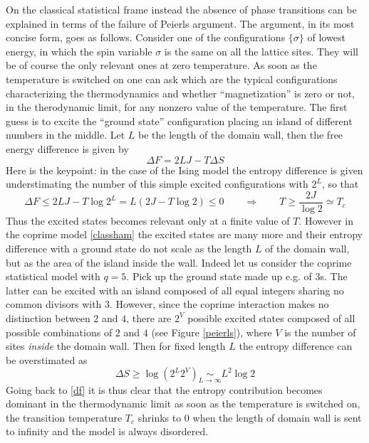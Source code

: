 \documentclass[aps,pra,superscriptaddress]{revtex4}
\newcommand\be            {\begin{equation}}
\newcommand\ee            {\end{equation}}
\renewcommand{\(}{\left(}
\renewcommand{\)}{\right)}
\renewcommand{\[}{\left[}
\renewcommand{\]}{\right]}
\begin{document}
On the classical statistical frame instead the absence of phase transitions can be explained in terms of the failure of Peierls argument. The argument, in its most concise form, goes as follows. Consider one of the configurations $\{ \sigma \}$ of lowest energy, in which the spin variable $\sigma$ is the same on all the lattice sites. They will be of course the only relevant ones at zero temperature. As soon as the temperature is switched on one can ask which are the typical configurations characterizing the thermodynamics and whether ``magnetization'' is zero or not, in the therodynamic limit, for any nonzero value of the temperature. The first guess is to excite the ``ground state'' configuration placing an island of different numbers in the middle. Let $L$ be the length of the domain wall, then the free energy difference is given by
\be 
\Delta F = 2 L J - T \Delta S
\ee
Here is the keypoint: in the case of the Ising model the entropy difference is given understimating the number of this simple excited configurations with $2^L$, so that
\be \label{df}
\Delta F \le 2 L J - T \log 2^L = L ( 2 J - T \log 2 ) \le 0
\qquad \Rightarrow \qquad
T \ge \frac{2 J}{ \log 2 } \simeq T_c
\ee 
Thus the excited states becomes relevant only at a finite value of $T$. However in the coprime model \eqref{classham} the excited states are many more and their entropy difference with a ground state do not scale as the length $L$ of the domain wall, but as the area of the island inside the wall. Indeed let us consider the coprime statistical model with $q=5$. Pick up the ground state made up e.g. of $3$s. The latter can be excited with an island composed of all equal integers sharing no common divisors with $3$. However, since the coprime interaction makes no distinction between $2$ and $4$, there are $2^V$ possible excited states composed of all possible combinations of $2$ and $4$ (see Figure \ref{peierls}), where $V$ is the number of sites \emph{inside} the domain wall. Then for fixed length $L$ the entropy difference can be overstimated as
\be 
\Delta S \ge \log ( 2^L 2^V ) \underset{L \to \infty}{\sim} L^2 \log 2
\ee
Going back to \eqref{df} it is thus clear that the entropy contribution becomes dominant in the thermodynamic limit as soon as the temperature is switched on, the transition temperature $T_c$ shrinks to $0$ when the length of domain wall is sent to infinity and the model is always disordered.
\end{document}
